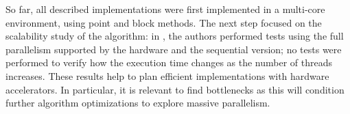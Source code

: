 
So far, all described implementations were first implemented in a multi-core environment, using point and block methods. The next step focused on the scalability study of the algorithm: in \cite{Deadman:Higham:Ralha:2013}, the authors performed tests using the full parallelism supported by the hardware and the sequential version; no tests were performed to verify how the execution time changes as the number of threads increases.
These results help to plan efficient implementations with hardware accelerators. In particular, it is relevant to find bottlenecks as this will condition further algorithm optimizations to explore massive parallelism.
